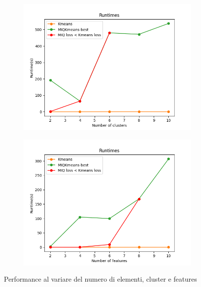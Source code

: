 \documentclass{article}
\begin{document}
\begin{figure}[h]
\begin{subfigure}{0.32\linewidth}
         \includegraphics[width=\linewidth]{../results/plots/runtime_centers_sint2}
     \end{subfigure}%
     \begin{subfigure}{0.32\linewidth}
         \includegraphics[width=\linewidth]{../results/plots/runtime_features_sint2}
     \end{subfigure}%
     \caption{Performance al variare del numero di elementi, cluster e features}
     \label{fig:runtime_loss_sint2}
    \end{figure}
\end{document}
